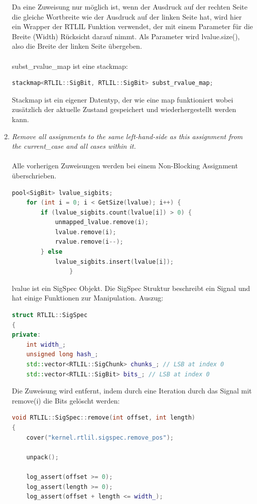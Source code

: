 \documentclass[11pt]{report}
\begin{document}
\begin{enumerate}
Da eine Zuweisung nur möglich ist, wenn der Ausdruck auf der rechten Seite die gleiche Wortbreite wie der Ausdruck auf der linken Seite hat, wird hier ein Wrapper der RTLIL Funktion verwendet, der mit einem Parameter für die Breite (Width) Rücksicht darauf nimmt. Als Parameter wird lvalue.size(), also die Breite der linken Seite übergeben.\\
\\
subst\_rvalue\_map ist eine stackmap:
\begin{lstlisting}[language=C++]
stackmap<RTLIL::SigBit, RTLIL::SigBit> subst_rvalue_map;
\end{lstlisting}

Stackmap ist ein eigener Datentyp, der wie eine map funktioniert wobei zusätzlich der aktuelle Zustand gespeichert und wiederhergestellt werden kann.

  
  \item \textit{Remove all assignments to the same left-hand-side as this assignment from the current\_case and all
cases within it.}
\\
\\
Alle vorherigen Zuweisungen werden bei einem Non-Blocking Assignment überschrieben.

\begin{lstlisting}[language=C++]
	pool<SigBit> lvalue_sigbits;
	for (int i = 0; i < GetSize(lvalue); i++) {
		if (lvalue_sigbits.count(lvalue[i]) > 0) {
			unmapped_lvalue.remove(i);
			lvalue.remove(i);
			rvalue.remove(i--);
		} else
			lvalue_sigbits.insert(lvalue[i]);
				}
\end{lstlisting}

lvalue ist ein SigSpec Objekt.
Die SigSpec Struktur beschreibt ein Signal und hat einige Funktionen zur Manipulation.
Auszug:
\begin{lstlisting}[language=C++]
struct RTLIL::SigSpec
{
private:
	int width_;
	unsigned long hash_;
	std::vector<RTLIL::SigChunk> chunks_; // LSB at index 0
	std::vector<RTLIL::SigBit> bits_; // LSB at index 0
\end{lstlisting}

Die Zuweisung wird entfernt, indem durch eine Iteration durch das Signal mit remove(i) die Bits gelöscht werden:
\begin{lstlisting}[language=C++]
void RTLIL::SigSpec::remove(int offset, int length)
{
	cover("kernel.rtlil.sigspec.remove_pos");

	unpack();

	log_assert(offset >= 0);
	log_assert(length >= 0);
	log_assert(offset + length <= width_);


\end{lstlisting}
\end{enumerate}
\end{document}
